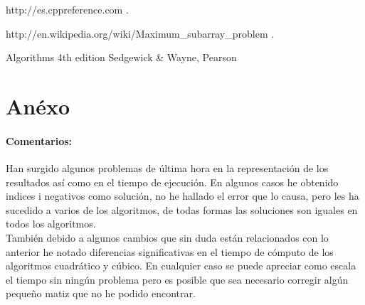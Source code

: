 \documentclass[es]{ifirak}
\begin{document}
\newpage
\begin{thebibliography}{arauak}
	
	 http://es.cppreference.com .
	
	 http://en.wikipedia.org/wiki/Maximum\_subarray\_problem .
	
	 Algorithms 4th edition Sedgewick \& Wayne, Pearson
	
\end{thebibliography}


\section{Anéxo}
\paragraph{Comentarios:}
Han surgido algunos problemas de última hora en la representación de los resultados así como en el tiempo de ejecución. En algunos casos he obtenido indices i negativos como solución, no he hallado el error que lo causa, pero les ha sucedido a varios de los algoritmos, de todas formas las soluciones son iguales en todos los algoritmos.\\
También debido a algunos cambios que sin duda están relacionados con lo anterior he notado  diferencias significativas en el tiempo de cómputo de los algoritmos cuadrático y cúbico. En cualquier caso se puede apreciar como escala el tiempo sin ningún problema pero es posible que sea necesario corregir algún pequeño matiz que no he podido encontrar.
\end{document}
